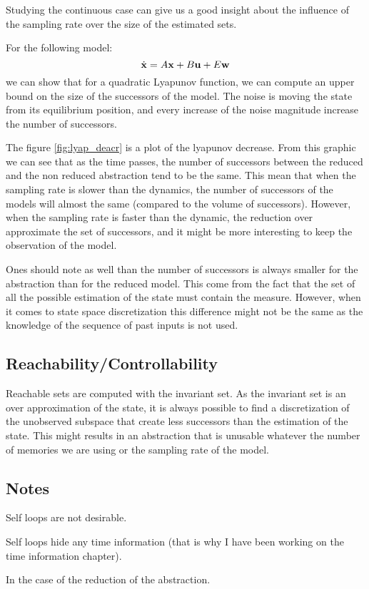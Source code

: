 Studying the continuous case can give us a good insight about the influence of the sampling rate over the size of the estimated sets.

For the following model:
\begin{equation}
\dot{ \mathbf{x}} = A  \mathbf{x} + B  \mathbf{u} + E  \mathbf{w}
\end{equation}
we can show that for a quadratic Lyapunov function, we can compute an upper bound on the size of the successors of the model.
The noise is moving the state from its equilibrium position, and every increase of the noise magnitude increase the number of successors.

The figure \ref{fig:lyap_deacr} is a plot of the lyapunov decrease.
From this graphic we can see that as the time passes, the number of successors between the reduced and the non reduced abstraction tend to be the same. This mean that when the sampling rate is slower than the dynamics, the number of successors of the models will almost the same (compared to the volume of successors).
However, when the sampling rate is faster than the dynamic, the reduction over approximate the set of successors, and it might be more interesting to keep the observation of the model.

Ones should note as well than the number of successors is always smaller for the abstraction than for the reduced model. This come from the fact that the set of all the possible estimation of the state must contain the measure.
However, when it comes to state space discretization this difference might not be the same as the knowledge of the sequence of past inputs is not used. 

\subsection{Reachability/Controllability}
Reachable sets are computed with the invariant set. As the invariant set is an over approximation of the state, it is always possible to find a discretization of the unobserved subspace that create less successors than the estimation of the state.
This might results in an abstraction that is unusable whatever the number of memories we are using or the sampling rate of the model.

\subsection{Notes}
Self loops are not desirable.

Self loops hide any time information (that is why I have been working on the time information chapter).

In the case of the reduction of the abstraction.